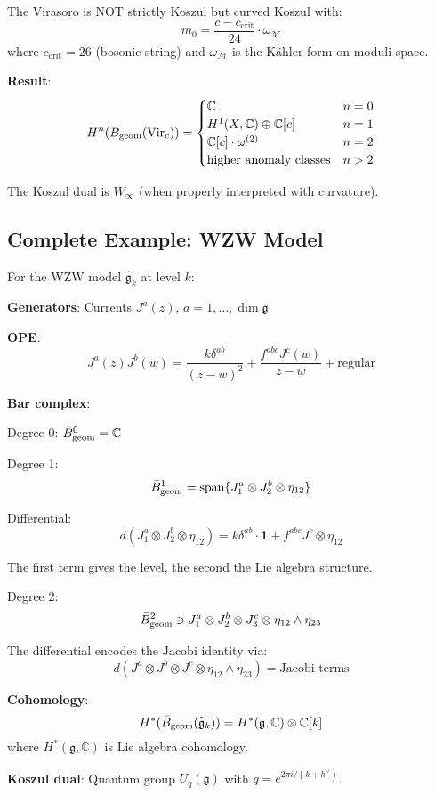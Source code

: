 \begin{example}
The Virasoro is NOT strictly Koszul but curved Koszul with:
$$m_0 = \frac{c - c_{\text{crit}}}{24} \cdot \omega_{\mathcal{M}}$$
where $c_{\text{crit}} = 26$ (bosonic string) and $\omega_{\mathcal{M}}$ is the Kähler form on moduli space.

\textbf{Result}:
$$H^n(\bar{B}_{\text{geom}}(\text{Vir}_c)) = \begin{cases}
\mathbb{C} & n = 0 \\
H^1(X, \mathbb{C}) \oplus \mathbb{C}[c] & n = 1 \\
\mathbb{C}[c] \cdot \omega^{(2)} & n = 2 \\
\text{higher anomaly classes} & n > 2
\end{cases}$$

The Koszul dual is $W_\infty$ (when properly interpreted with curvature).
\end{example}

\subsection{Complete Example: WZW Model}

\begin{example}
For the WZW model $\widehat{\mathfrak{g}}_k$ at level $k$:

\textbf{Generators}: Currents $J^a(z)$, $a = 1, \ldots, \dim \mathfrak{g}$

\textbf{OPE}: 
$$J^a(z)J^b(w) = \frac{k\delta^{ab}}{(z-w)^2} + \frac{f^{abc}J^c(w)}{z-w} + \text{regular}$$

\textbf{Bar complex}:

Degree 0: $\bar{B}_{\text{geom}}^0 = \mathbb{C}$

Degree 1: 
$$\bar{B}_{\text{geom}}^1 = \text{span}\{J^a_1 \otimes J^b_2 \otimes \eta_{12}\}$$

Differential:
$$d(J^a_1 \otimes J^b_2 \otimes \eta_{12}) = k\delta^{ab} \cdot \mathbf{1} + f^{abc}J^c \otimes \eta_{12}$$

The first term gives the level, the second the Lie algebra structure.

Degree 2:
$$\bar{B}_{\text{geom}}^2 \ni J^a_1 \otimes J^b_2 \otimes J^c_3 \otimes \eta_{12} \wedge \eta_{23}$$

The differential encodes the Jacobi identity via:
$$d(J^a \otimes J^b \otimes J^c \otimes \eta_{12} \wedge \eta_{23}) = \text{Jacobi terms}$$

\textbf{Cohomology}:
$$H^*(\bar{B}_{\text{geom}}(\widehat{\mathfrak{g}}_k)) = H^*(\mathfrak{g}, \mathbb{C}) \otimes \mathbb{C}[k]$$
where $H^*(\mathfrak{g}, \mathbb{C})$ is Lie algebra cohomology.

\textbf{Koszul dual}: Quantum group $U_q(\mathfrak{g})$ with $q = e^{2\pi i/(k+h^\vee)}$.
\end{example}


